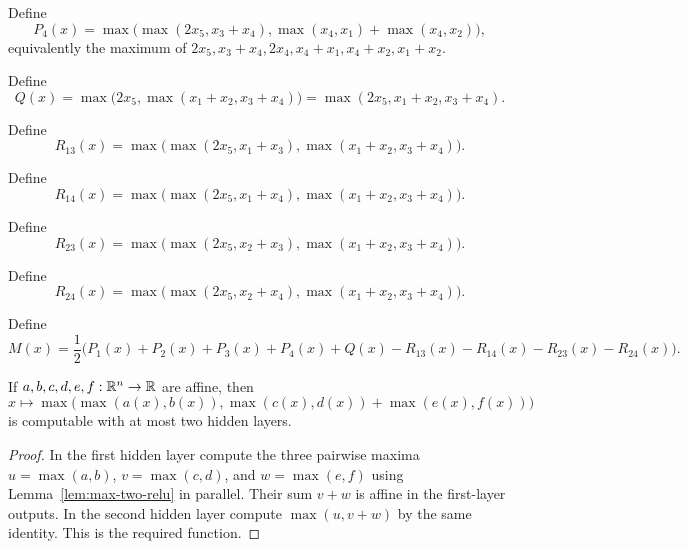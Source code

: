 \begin{definition}
  \label{def:p4}
  Define
  \[
  P_4(x)=\max\!\bigl(\max(2x_5,x_3+x_4),
               \max(x_4,x_1)+\max(x_4,x_2)\bigr),
  \]
  equivalently the maximum of
  $2x_5,x_3+x_4,2x_4,x_4+x_1,x_4+x_2,x_1+x_2$.
\end{definition}

\begin{definition}
  \label{def:q}
  Define
  \[
    Q(x)=\max\bigl(2x_5,\max(x_1+x_2,x_3+x_4)\bigr)
        =\max(2x_5,x_1+x_2,x_3+x_4).
  \]
\end{definition}

\begin{definition}
  \label{def:r13}
  Define
  \[
  R_{13}(x)=\max\bigl(\max(2x_5,x_1+x_3),
                       \max(x_1+x_2,x_3+x_4)\bigr).
  \]
\end{definition}

\begin{definition}
  \label{def:r14}
  Define
  \[
  R_{14}(x)=\max\bigl(\max(2x_5,x_1+x_4),
                       \max(x_1+x_2,x_3+x_4)\bigr).
  \]
\end{definition}

\begin{definition}
  \label{def:r23}
  Define
  \[
  R_{23}(x)=\max\bigl(\max(2x_5,x_2+x_3),
                       \max(x_1+x_2,x_3+x_4)\bigr).
  \]
\end{definition}

\begin{definition}
  \label{def:r24}
  Define
  \[
  R_{24}(x)=\max\bigl(\max(2x_5,x_2+x_4),
                       \max(x_1+x_2,x_3+x_4)\bigr).
  \]
\end{definition}

\begin{definition}
  \label{def:m-expression}
  Define
  \[
  M(x)=\frac12\bigl(P_1(x)+P_2(x)+P_3(x)+P_4(x)+Q(x)
             -R_{13}(x)-R_{14}(x)-R_{23}(x)-R_{24}(x)\bigr).
  \]
\end{definition}

\begin{lemma}
  \label{lem:two-layer-template}
  If $a,b,c,d,e,f:\mathbb{R}^n\to\mathbb{R}$ are affine, then
  \[
    x\longmapsto
    \max\bigl(\max(a(x),b(x)),\max(c(x),d(x))+\max(e(x),f(x))\bigr)
  \]
  is computable with at most two hidden layers.
\end{lemma}
\begin{proof}
  In the first hidden layer compute the three pairwise maxima
  $u=\max(a,b)$, $v=\max(c,d)$, and $w=\max(e,f)$ using
  Lemma~\ref{lem:max-two-relu} in parallel.  Their sum $v+w$ is affine in the
  first-layer outputs.  In the second hidden layer compute
  $\max(u,v+w)$ by the same identity.  This is the required function.
\end{proof}

